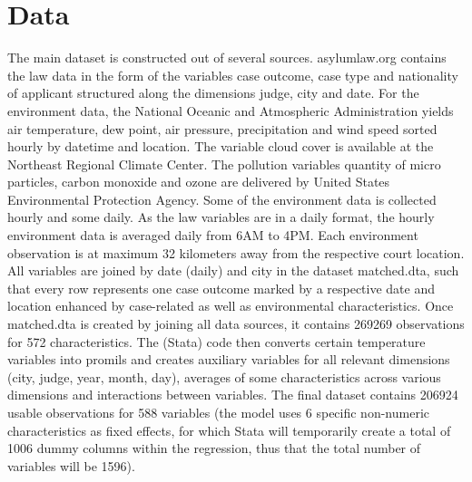 \documentclass[11pt]{article}
\begin{document}
	\section{Data}
	The main dataset is constructed out of several sources. asylumlaw.org contains the law data in the form of the variables case outcome, case type and nationality of applicant structured along the dimensions judge, city and date. For the environment data, the National Oceanic and Atmospheric Administration yields air temperature, dew point, air pressure, precipitation and wind speed sorted hourly by datetime and location. The variable cloud cover is available at the Northeast Regional Climate Center. The pollution variables quantity of micro particles, carbon monoxide and ozone are delivered by United States Environmental Protection Agency. Some of the environment data is collected hourly and some daily. As the law variables are in a daily format, the hourly environment data is averaged daily from 6AM to 4PM. Each environment observation is at maximum 32 kilometers away from the respective court location.
	All variables are joined by date (daily) and city in the dataset matched.dta, such that every row represents one case outcome marked by a respective date and location enhanced by case-related as well as environmental characteristics. \newline
	Once matched.dta is created by joining all data sources, it contains 269269 observations for 572 characteristics. The (Stata) code then converts certain temperature variables into promils and creates auxiliary variables for all relevant dimensions (city, judge, year, month, day), averages of some characteristics across various dimensions and interactions between variables. The final dataset contains 206924 usable observations for 588 variables (the model uses 6 specific non-numeric characteristics as fixed effects, for which Stata will temporarily create a total of 1006 dummy columns within the regression, thus that the total number of variables will be 1596).
	\newline	
\end{document}
